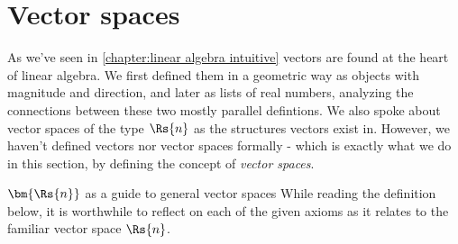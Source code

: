 \section{Vector spaces}
As we've seen in \autoref{chapter:linear algebra intuitive} vectors are found at the heart of linear algebra. We first defined them in a geometric way as objects with magnitude and direction, and later as lists of real numbers, analyzing the connections between these two mostly parallel defintions. We also spoke about vector spaces of the type $\Rs{n}$ as the structures vectors exist in. However, we haven't defined vectors nor vector spaces formally - which is exactly what we do in this section, by defining the concept of \emph{vector spaces}.

\begin{note}{$\bm{\Rs{n}}$ as a guide to general vector spaces}{}
	While reading the definition below, it is worthwhile to reflect on each of the given axioms as it relates to the familiar vector space $\Rs{n}$.
\end{note}


